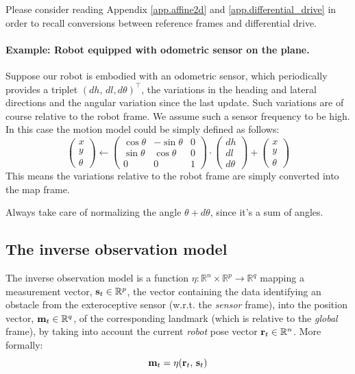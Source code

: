 		Please consider reading Appendix \ref{app.affine2d} and \ref{app.differential_drive} in order to recall conversions between reference frames and differential drive.
		
	\paragraph{Example: Robot equipped with odometric sensor on the plane.}
		Suppose our robot is embodied with an odometric sensor, which periodically provides a triplet $(dh,\, dl, d\theta)^\top$, \ie{} the variations in the heading and lateral directions and the angular variation since the last update. 
		Such variations are of course relative to the robot frame.
		We assume such a sensor frequency to be high.
		In this case the motion model could be simply defined as follows:
		\begin{equation}
			\label{eq.motion.odometrix}
			\left(\begin{array}{c}
				x \\ y \\ \theta
			\end{array}\right)
			\leftarrow
			\left(\begin{array}{ccc}
				\cos{\theta} & -\sin{\theta} & 0 \\
				\sin{\theta} & \cos{\theta} & 0 \\
				0 & 0 & 1
			\end{array}\right)
			\cdot
			\left(\begin{array}{c}
				dh \\
				dl \\
				d\theta
			\end{array}\right)
			+
			\left(\begin{array}{c}
				x \\ y \\ \theta
			\end{array}\right)
		\end{equation}
		This means the variations relative to the robot frame are simply converted into the map frame.
		
		\begin{important}
			Always take care of normalizing the angle $\theta + d\theta$, since it's a sum of angles.
		\end{important}

\subsection{The inverse observation model}
	The inverse observation model is a function $\eta : \mathbb{R}^n \times \mathbb{R}^p \rightarrow \mathbb{R}^q$ mapping a measurement vector, $\boldsymbol{\mathrm{{s}}}_{t} \in \mathbb{R}^p$, \ie{} the vector containing the data identifying an obstacle from the exteroceptive sensor (w.r.t. the \emph{sensor} frame), into the position vector, $\boldsymbol{\mathrm{{m}}}_{t} \in \mathbb{R}^q$, of the corresponding landmark (which is relative to the \emph{global} frame), by taking into account the current \emph{robot} pose vector $\boldsymbol{\mathrm{{r}}}_t \in \mathbb{R}^n$.
	More formally:
	\[
		\boldsymbol{\mathrm{{m}}}_t = \eta(\boldsymbol{\mathrm{{r}}}_{t},\, \boldsymbol{\mathrm{{s}}}_t)
	\]
	
